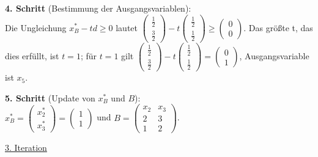 \documentclass[10pt,a4paper,oneside,ngerman,numbers=noenddot]{scrartcl}
\begin{document}
		\textbf{4. Schritt} (Bestimmung der Ausgangsvariablen):\\
		Die Ungleichung $x_{B}^{*} - td \geq 0$ lautet $\begin{pmatrix} \frac{1}{2} \\ \frac{3}{2}\end{pmatrix} - t \begin{pmatrix}\frac{1}{2} \\ \frac{1}{2} \end{pmatrix} \geq \begin{pmatrix} 0 \\ 0 \end{pmatrix}$. Das größte t, das dies erfüllt, ist $t = 1$; für $t = 1$ gilt $\begin{pmatrix} \frac{1}{2} \\ \frac{3}{2}\end{pmatrix} - t \begin{pmatrix}\frac{1}{2} \\ \frac{1}{2} \end{pmatrix} = \begin{pmatrix} 0 \\ 1 \end{pmatrix}$, Ausgangsvariable ist $x_{5}$.
		
		\textbf{5. Schritt} (Update von $x_{B}^{*}$ und $B$):\\
		$x_{B}^{*} = \begin{pmatrix} x_{2}^{*} \\ x_{3}^{*} \end{pmatrix} = \begin{pmatrix} 1 \\ 1 \end{pmatrix}$ und $B = \begin{pmatrix} x_{2} & x_{3} \\ 2 & 3 \\ 1 & 2 \end{pmatrix}$.
		
		\underline{3. Iteration}
		
\end{document}
